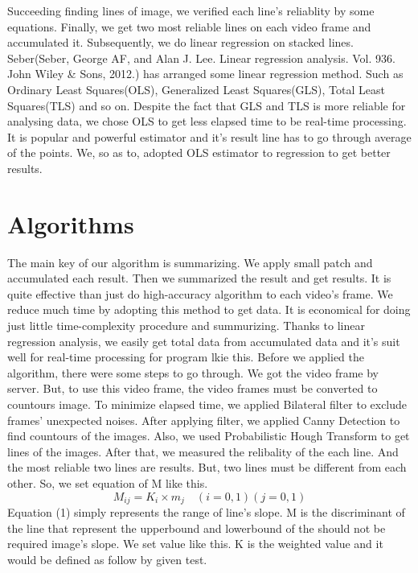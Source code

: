 \documentclass[a4class]{article}
\begin{document}
Succeeding finding lines of image, we verified each line's reliablity by some equations. \newline
Finally, we get two most reliable lines on each video frame and accumulated it. Subsequently, we do linear regression on stacked lines. Seber(Seber, George AF, and Alan J. Lee. Linear regression analysis. Vol. 936. John Wiley \& Sons, 2012.) has arranged some linear regression method. Such as Ordinary Least Squares(OLS), Generalized Least Squares(GLS), Total Least Squares(TLS) and so on. Despite the fact that GLS and TLS is more reliable for analysing data, we chose OLS to get less elapsed time to be real-time processing. It is popular and powerful estimator and it's result line has to go through average of the points. We, so as to, adopted OLS estimator to regression to get better results. 
\section{Algorithms}
The main key of our algorithm is summarizing. We apply small patch and accumulated each result. Then we summarized the result and get results. It is quite effective than just do high-accuracy algorithm to each video's frame. We reduce much time by adopting this method to get data. It is economical for doing just little time-complexity procedure and summurizing. Thanks to linear regression analysis, we easily get total data from accumulated data and it's suit well for real-time processing for program lkie this.
\newline\newline 
Before we applied the algorithm, there were some steps to go through. We got the video frame by server. But, to use this video frame, the video frames must be converted to countours image. To minimize elapsed time, we applied Bilateral filter to exclude frames' unexpected noises. After applying filter, we applied Canny Detection to find countours of the images. Also, we used Probabilistic Hough Transform to get lines of the images. After that, we measured the relibality of the each line. And the most reliable two lines are results. But, two lines must be different from each other. So, we set equation of M like this.
\begin{equation}
\mathit{{M}_{ij} = {K}_{i} \times {m}_{j}} \quad\left(i=0,1 \right) \left(j=0,1 \right)
\end{equation}
Equation (1) simply represents the range of line's slope. M is the discriminant of the line that represent the upperbound and lowerbound of the should not be required image's slope. We set value like this. K is the weighted value and it would be defined as follow by given test.
\end{document}
